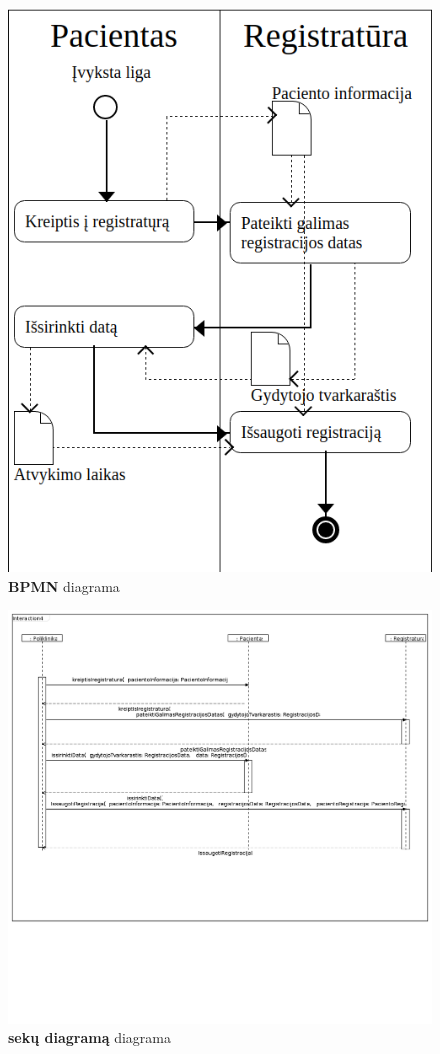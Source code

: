 \documentclass{VUMIFInfBakalaurinis}
\begin{document}
\begin{figure}[H]
	\centering
	\includegraphics[scale=0.5]{img/bpmn_diagrama}
	\caption{\textbf{BPMN} diagrama}
	\label{img:bpmn}
\end{figure} 
\begin{figure}[H]
	\centering
	\includegraphics[scale=0.5]{img/sequence_example}
	\caption{\textbf{sekų diagramą} diagrama}
	\label{img:sequence}
\end{figure} 
\end{document}
